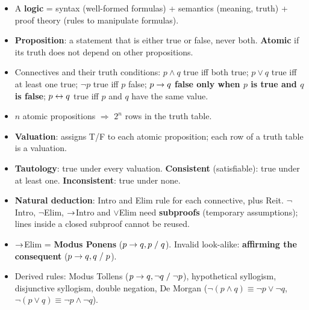 \begin{nbsummary}
\begin{itemize}[nosep]
  \item A \textbf{logic} = syntax (well-formed formulas) + semantics (meaning, truth) +
        proof theory (rules to manipulate formulas).
  \item \textbf{Proposition}: a statement that is either true or false, never both.
        \textbf{Atomic} if its truth does not depend on other propositions.
  \item Connectives and their truth conditions:
        $p \land q$ true iff both true; $p \lor q$ true iff at least one true;
        $\neg p$ true iff $p$ false; $p \rightarrow q$ \textbf{false only when $p$ is true and
        $q$ is false}; $p \leftrightarrow q$ true iff $p$ and $q$ have the same value.
  \item $n$ atomic propositions $\Rightarrow$ $2^n$ rows in the truth table.
  \item \textbf{Valuation}: assigns T/F to each atomic proposition; each row of a truth
        table is a valuation.
  \item \textbf{Tautology}: true under every valuation. \textbf{Consistent}
        (satisfiable): true under at least one. \textbf{Inconsistent}: true under none.
  \item \textbf{Natural deduction}: Intro and Elim rule for each connective, plus Reit.
        $\neg$Intro, $\neg$Elim, $\rightarrow$Intro and $\lor$Elim need \textbf{subproofs}
        (temporary assumptions); lines inside a closed subproof cannot be reused.
  \item $\rightarrow$Elim = \textbf{Modus Ponens} ($p\rightarrow q, p \;/\; q$). Invalid look-alike:
        \textbf{affirming the consequent} ($p\rightarrow q, q \;/\; p$).
  \item Derived rules: Modus Tollens ($p\rightarrow q, \neg q \;/\; \neg p$), hypothetical
        syllogism, disjunctive syllogism, double negation, De Morgan
        ($\neg(p\land q) \equiv \neg p\lor\neg q$, $\neg(p\lor q)\equiv\neg p\land\neg q$).
\end{itemize}
\end{nbsummary}
